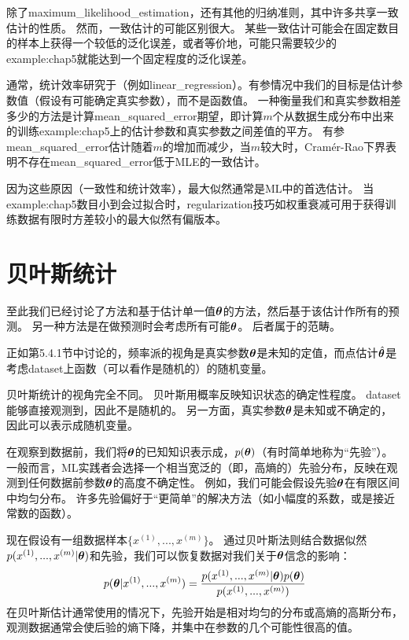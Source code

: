 除了\gls{maximum_likelihood_estimation}，还有其他的归纳准则，其中许多共享一致估计的性质。
然而，一致估计的可能区别很大。
某些一致估计可能会在固定数目的样本上获得一个较低的泛化误差，或者等价地，可能只需要较少的\gls{example:chap5}就能达到一个固定程度的泛化误差。

通常，统计效率研究于（例如\gls{linear_regression}）。有参情况中我们的目标是估计参数值（假设有可能确定真实参数），而不是函数值。
一种衡量我们和真实参数相差多少的方法是计算\gls{mean_squared_error}期望，即计算$m$个从数据生成分布中出来的训练\gls{example:chap5}上的估计参数和真实参数之间差值的平方。
有参\gls{mean_squared_error}估计随着$m$的增加而减少，当$m$较大时，Cram\'er-Rao下界\citep{Rao-1945,Cramer-1946}表明不存在\gls{mean_squared_error}低于\gls{MLE}的一致估计。

因为这些原因（一致性和统计效率），最大似然通常是\gls{ML}中的首选估计。
当\gls{example:chap5}数目小到会过拟合时，\gls{regularization}技巧如权重衰减可用于获得训练数据有限时方差较小的最大似然有偏版本。


\section{贝叶斯统计}
\label{sec:bayesian_statistics}
至此我们已经讨论了方法和基于估计单一值$\boldsymbol{\theta}$的方法，然后基于该估计作所有的预测。
另一种方法是在做预测时会考虑所有可能$\boldsymbol{\theta}$。
后者属于的范畴。

正如第5.4.1节中讨论的，频率派的视角是真实参数$\boldsymbol{\theta}$是未知的定值，而点估计$\hat{\boldsymbol{\theta}}$是考虑\gls{dataset}上函数（可以看作是随机的）的随机变量。

贝叶斯统计的视角完全不同。
贝叶斯用概率反映知识状态的确定性程度。
\gls{dataset}能够直接观测到，因此不是随机的。
另一方面，真实参数$\boldsymbol{\theta}$是未知或不确定的，因此可以表示成随机变量。

在观察到数据前，我们将$\boldsymbol{\theta}$的已知知识表示成，$p(\boldsymbol{\theta})$（有时简单地称为“先验”）。
一般而言，\gls{ML}实践者会选择一个相当宽泛的（即，高熵的）先验分布，反映在观测到任何数据前参数$\boldsymbol{\theta}$的高度不确定性。
例如，我们可能会假设先验$\boldsymbol{\theta}$在有限区间中均匀分布。
许多先验偏好于“更简单”的解决方法（如小幅度的系数，或是接近常数的函数）。

现在假设有一组数据样本$\{x^{(1)},...,x^{(m)}\}$。
通过贝叶斯法则结合数据似然$p(x^{(1)},...,x^{(m)}|\boldsymbol{\theta})$和先验，我们可以恢复数据对我们关于$\boldsymbol{\theta}$信念的影响：
\begin{equation}
        p(\boldsymbol{\theta}|x^{(1)},...,x^{(m)}) = 
        \frac{p(x^{(1)},...,x^{(m)}|\boldsymbol{\theta}) p(\boldsymbol{\theta})}
            {p(x^{(1)},...,x^{(m)})}
\end{equation}
在贝叶斯估计通常使用的情况下，先验开始是相对均匀的分布或高熵的高斯分布，观测数据通常会使后验的熵下降，并集中在参数的几个可能性很高的值。

